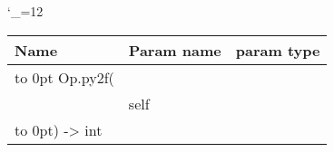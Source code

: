 \begingroup \catcode`\_=12 \tt
\begin{tabular}{lll}
\toprule
\textrm{Name}&\textrm{Param name}&\textrm{param type}\\
\midrule
\hbox to 0pt {Op.py2f(\hss}\\
& self\\
\hbox to 0pt{) -> int\hss}\\
\bottomrule
\end{tabular}
\endgroup

